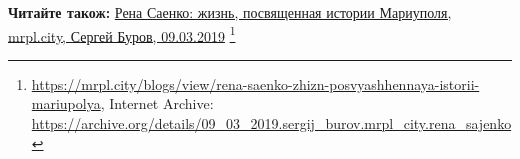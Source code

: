 
 
 
 
 

\textbf{Читайте також:} \href{https://archive.org/details/09_03_2019.sergij_burov.mrpl_city.rena_sajenko}{%
Рена Саенко: жизнь, посвященная истории Мариуполя, mrpl.city, Сергей Буров, 09.03.2019}
\footnote{
\url{https://mrpl.city/blogs/view/rena-saenko-zhizn-posvyashhennaya-istorii-mariupolya}, %
Internet Archive: \url{https://archive.org/details/09_03_2019.sergij_burov.mrpl_city.rena_sajenko}
}
